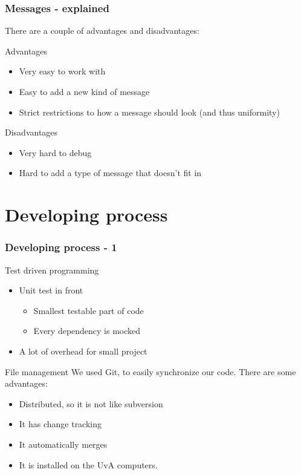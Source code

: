 \documentclass{beamer}
\begin{document}
\begin{frame}
\frametitle{Messages - explained}
There are a couple of advantages and disadvantages:
\begin{block}{Advantages}
\begin{itemize}
\item Very easy to work with
\item Easy to add a new kind of message
\item Strict restrictions to how a message should look (and thus uniformity)
\end{itemize}
\end{block}

\begin{block}{Disadvantages}
\begin{itemize}
\item Very hard to debug
\item Hard to add a type of message that doesn't fit in
\end{itemize}
\end{block}
\end{frame}

\section{Developing process}
\begin{frame}
\frametitle{Developing process - 1}
\begin{block}{Test driven programming}
\begin{itemize}
    \item Unit test in front
    \begin{itemize}
        \item Smallest testable part of code
        \item Every dependency is mocked
    \end{itemize}
    \item A lot of overhead for small project
\end{itemize}
\end{block}
\begin{block}{File management}
We used Git, to easily synchronize our code. There are some advantages:
\begin{itemize}
    \item Distributed, so it is not like subversion
    \item It has change tracking
    \item It automatically merges
    \item It is installed on the UvA computers.
\end{itemize}
\end{block}
\end{frame}
\end{document}
